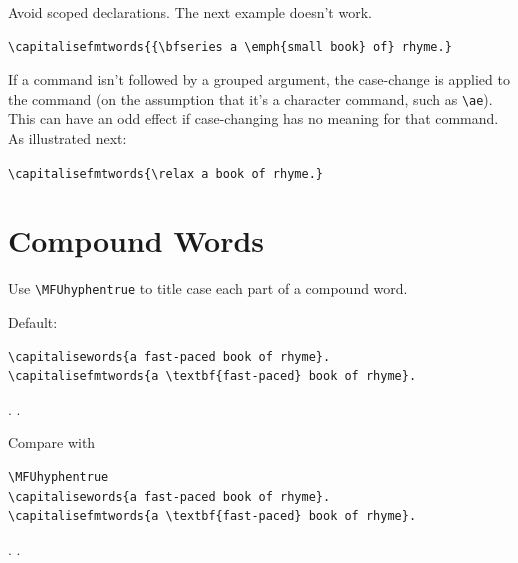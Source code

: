 \documentclass{article}
\begin{document}
\medskip

Avoid scoped declarations. The next example doesn't work.

\begin{verbatim}
\capitalisefmtwords{{\bfseries a \emph{small book} of} rhyme.}
\end{verbatim}

\medskip

If a command isn't followed by a grouped argument, the
case-change is applied to the command (on the assumption
that it's a character command, such as \verb|\ae|). This can
have an odd effect if case-changing has no meaning for that command.
As illustrated next:

\verb|\capitalisefmtwords{\relax a book of rhyme.}|

\section{Compound Words}

Use \verb|\MFUhyphentrue| to title case each part of
a compound word.

Default:
\begin{verbatim}
\capitalisewords{a fast-paced book of rhyme}.
\capitalisefmtwords{a \textbf{fast-paced} book of rhyme}.
\end{verbatim}
.
.

Compare with
\begin{verbatim}
\MFUhyphentrue
\capitalisewords{a fast-paced book of rhyme}.
\capitalisefmtwords{a \textbf{fast-paced} book of rhyme}.
\end{verbatim}
\MFUhyphentrue
{}.
.
\end{document}
